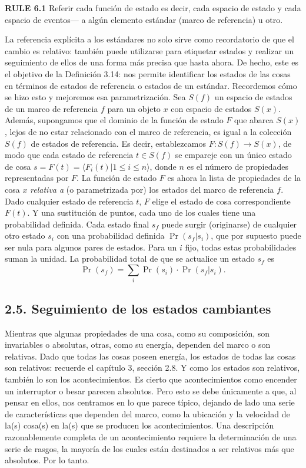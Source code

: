 \begin{justifying}
  \textbf{RULE 6.1} Referir cada función de estado es decir, cada espacio de estado y cada espacio de eventos— a algún elemento estándar (marco de referencia) u otro.

  La referencia explícita a los estándares no solo sirve como recordatorio de que el cambio es relativo: también puede utilizarse para etiquetar estados y realizar un seguimiento de ellos de una forma más precisa que hasta ahora. De hecho, este es el objetivo de la Definición 3.14: nos permite identificar los estados de las cosas en términos de estados de referencia o estados de un estándar. Recordemos cómo se hizo esto y mejoremos esa parametrización.
  Sea $S(f)$ un espacio de estados de un marco de referencia $f$ para un objeto $x$ con espacio de estados $S(x)$. Además, supongamos que el dominio de la función de estado $F$ que abarca $S(x)$, lejos de no estar relacionado con el marco de referencia, es igual a la colección $S(f)$ de estados de referencia. Es decir, establezcamos $F: S(f) \to S(x)$, de modo que cada estado de referencia $t \in S(f)$ se empareje con un único estado de cosa $s=F(t) = \langle F_i(t)| 1 \le i \le n \rangle$, donde $n$ es el número de propiedades representadas por $F$. La función de estado $F$ es ahora la lista de propiedades de la cosa $x$ \textit{relativa a} (o parametrizada por) los estados del marco de referencia $f$. Dado cualquier estado de referencia $t$, $F$ elige el estado de cosa correspondiente $F(t)$. Y una sustitución de puntos, cada uno de los cuales tiene una probabilidad definida. Cada estado final $s_f$ puede surgir (originarse) de cualquier otro estado $s_i$ con una probabilidad definida $\Pr(s_f|s_i)$, que por supuesto puede ser nula para algunos pares de estados. Para un $i$ fijo, todas estas probabilidades suman la unidad. La probabilidad total de que se actualice un estado $s_f$ es
  \[
  \Pr(s_f) = \sum_i \Pr(s_i) \cdot \Pr(s_f|s_i).
  \]

  \subsection*{2.5. Seguimiento de los estados cambiantes}

  Mientras que algunas propiedades de una cosa, como su composición, son invariables o absolutas, otras, como su energía, dependen del marco o son relativas. Dado que todas las cosas poseen energía, los estados de todas las cosas son relativos: recuerde el capítulo 3, sección 2.8. Y como los estados son relativos, también lo son los acontecimientos. Es cierto que acontecimientos como encender un interruptor o besar parecen absolutos. Pero esto se debe únicamente a que, al pensar en ellos, nos centramos en lo que parece típico, dejando de lado una serie de características que dependen del marco, como la ubicación y la velocidad de la(s) cosa(s) en la(s) que se producen los acontecimientos. Una descripción razonablemente completa de un acontecimiento requiere la determinación de una serie de rasgos, la mayoría de los cuales están destinados a ser relativos más que absolutos. Por lo tanto.


\end{justifying}
